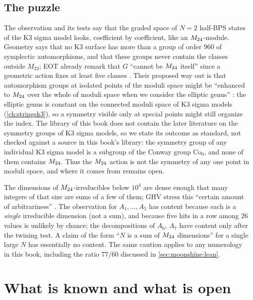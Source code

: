 \subsection{The puzzle}\label{sec:moonshine:puzzle}

The observation and its tests say that the graded space of $N=2$ half-BPS states of the K3
sigma model looks, coefficient by coefficient, like an $M_{24}$-module. Geometry says that
no K3 surface has more than a group of order $960$ of symplectic automorphisms, and that
these groups never contain the classes outside $M_{23}$; EOT already remark that $G$
``cannot be $M_{24}$ itself'' since a geometric action fixes at least five classes
. Their proposed way out is that automorphism groups at
isolated points of the moduli space might be ``enhanced to $M_{24}$ over the whole of moduli
space when we consider the elliptic genus'' : the elliptic
genus is constant on the connected moduli space of K3 sigma models (\cref{ch:stringsk3}),
so a symmetry visible only at special points might still organize the index. The library of
this book does not contain the later literature on the symmetry groups of K3 sigma models,
so we state its outcome as standard, not checked against a source in this book's library:
the symmetry group of any individual K3 sigma model is a subgroup of the Conway group
$\mathrm{Co}_0$, and none of them contains $M_{24}$. Thus the $M_{24}$ action is not the symmetry
of any one point in moduli space, and where it comes from remains open.

\begin{pitfallbox}
The dimensions of $M_{24}$-irreducibles below $10^4$ are dense enough that many integers
of that size are sums of a few of them; GHV stress this ``certain amount of arbitrariness''
. The observation for $A_1,\dots,A_5$ has content because each
is a \emph{single} irreducible dimension (not a sum), and because five hits in a row among
$26$ values is unlikely by chance; the decompositions of $A_6$, $A_7$ have content only
after the twining test. A claim of the form ``$N$ is a sum of $M_{24}$ dimensions'' for a
single large $N$ has essentially no content. The same caution applies to any numerology in
this book, including the ratio $77/60$ discussed in \cref{sec:moonshine:lean}.
\end{pitfallbox}

\section{What is known and what is open}\label{sec:moonshine:status}

